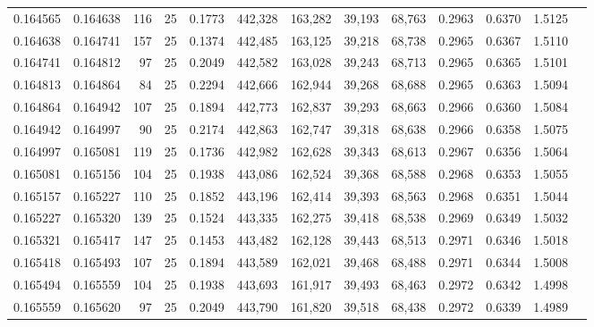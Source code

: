 \begin{tabular}{rrrrrrrrrrrrr}
0.164565 & 0.164638 &   116 &  25 &                                     0.1773 & 442,328 & 163,282 &  39,193 &  68,763 & 0.2963 & 0.6370 & 1.5125 \\
0.164638 & 0.164741 &   157 &  25 &                                     0.1374 & 442,485 & 163,125 &  39,218 &  68,738 & 0.2965 & 0.6367 & 1.5110 \\
0.164741 & 0.164812 &    97 &  25 &                                     0.2049 & 442,582 & 163,028 &  39,243 &  68,713 & 0.2965 & 0.6365 & 1.5101 \\
0.164813 & 0.164864 &    84 &  25 &                                     0.2294 & 442,666 & 162,944 &  39,268 &  68,688 & 0.2965 & 0.6363 & 1.5094 \\
0.164864 & 0.164942 &   107 &  25 &                                     0.1894 & 442,773 & 162,837 &  39,293 &  68,663 & 0.2966 & 0.6360 & 1.5084 \\
0.164942 & 0.164997 &    90 &  25 &                                     0.2174 & 442,863 & 162,747 &  39,318 &  68,638 & 0.2966 & 0.6358 & 1.5075 \\
0.164997 & 0.165081 &   119 &  25 &                                     0.1736 & 442,982 & 162,628 &  39,343 &  68,613 & 0.2967 & 0.6356 & 1.5064 \\
0.165081 & 0.165156 &   104 &  25 &                                     0.1938 & 443,086 & 162,524 &  39,368 &  68,588 & 0.2968 & 0.6353 & 1.5055 \\
0.165157 & 0.165227 &   110 &  25 &                                     0.1852 & 443,196 & 162,414 &  39,393 &  68,563 & 0.2968 & 0.6351 & 1.5044 \\
0.165227 & 0.165320 &   139 &  25 &                                     0.1524 & 443,335 & 162,275 &  39,418 &  68,538 & 0.2969 & 0.6349 & 1.5032 \\
0.165321 & 0.165417 &   147 &  25 &                                     0.1453 & 443,482 & 162,128 &  39,443 &  68,513 & 0.2971 & 0.6346 & 1.5018 \\
0.165418 & 0.165493 &   107 &  25 &                                     0.1894 & 443,589 & 162,021 &  39,468 &  68,488 & 0.2971 & 0.6344 & 1.5008 \\
0.165494 & 0.165559 &   104 &  25 &                                     0.1938 & 443,693 & 161,917 &  39,493 &  68,463 & 0.2972 & 0.6342 & 1.4998 \\
0.165559 & 0.165620 &    97 &  25 &                                     0.2049 & 443,790 & 161,820 &  39,518 &  68,438 & 0.2972 & 0.6339 & 1.4989 \\

\end{tabular}
